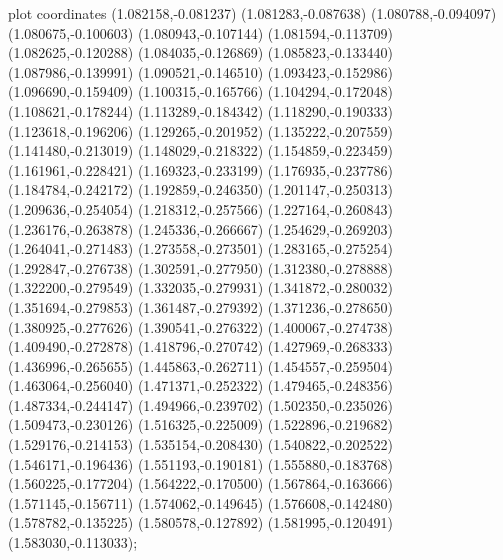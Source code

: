{ plot coordinates {(1.082158,-0.081237) (1.081283,-0.087638) (1.080788,-0.094097) (1.080675,-0.100603) (1.080943,-0.107144) (1.081594,-0.113709) (1.082625,-0.120288) (1.084035,-0.126869) (1.085823,-0.133440) (1.087986,-0.139991) (1.090521,-0.146510) (1.093423,-0.152986) (1.096690,-0.159409) (1.100315,-0.165766) (1.104294,-0.172048) (1.108621,-0.178244) (1.113289,-0.184342) (1.118290,-0.190333) (1.123618,-0.196206) (1.129265,-0.201952) (1.135222,-0.207559) (1.141480,-0.213019) (1.148029,-0.218322) (1.154859,-0.223459) (1.161961,-0.228421) (1.169323,-0.233199) (1.176935,-0.237786) (1.184784,-0.242172) (1.192859,-0.246350) (1.201147,-0.250313) (1.209636,-0.254054) (1.218312,-0.257566) (1.227164,-0.260843) (1.236176,-0.263878) (1.245336,-0.266667) (1.254629,-0.269203) (1.264041,-0.271483) (1.273558,-0.273501) (1.283165,-0.275254) (1.292847,-0.276738) (1.302591,-0.277950) (1.312380,-0.278888) (1.322200,-0.279549) (1.332035,-0.279931) (1.341872,-0.280032) (1.351694,-0.279853) (1.361487,-0.279392) (1.371236,-0.278650) (1.380925,-0.277626) (1.390541,-0.276322) (1.400067,-0.274738) (1.409490,-0.272878) (1.418796,-0.270742) (1.427969,-0.268333) (1.436996,-0.265655) (1.445863,-0.262711) (1.454557,-0.259504) (1.463064,-0.256040) (1.471371,-0.252322) (1.479465,-0.248356) (1.487334,-0.244147) (1.494966,-0.239702) (1.502350,-0.235026) (1.509473,-0.230126) (1.516325,-0.225009) (1.522896,-0.219682) (1.529176,-0.214153) (1.535154,-0.208430) (1.540822,-0.202522) (1.546171,-0.196436) (1.551193,-0.190181) (1.555880,-0.183768) (1.560225,-0.177204) (1.564222,-0.170500) (1.567864,-0.163666) (1.571145,-0.156711) (1.574062,-0.149645) (1.576608,-0.142480) (1.578782,-0.135225) (1.580578,-0.127892) (1.581995,-0.120491) (1.583030,-0.113033)};
}
